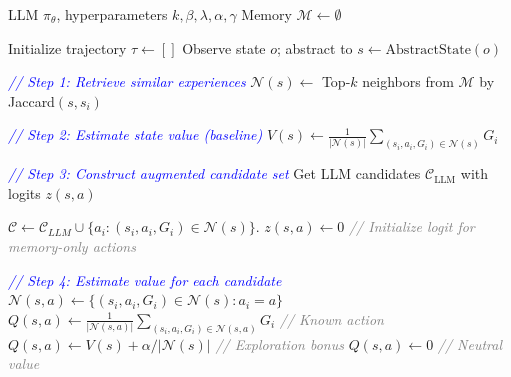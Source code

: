 


\begin{algorithm}[h]
    \caption{JitRL: Test-Time Policy Optimization}
    \label{alg:jitrl}
 \begin{algorithmic}
     LLM $\pi_\theta$, hyperparameters $k, \beta, \lambda, \alpha, \gamma$
     Memory $\mathcal{M} \leftarrow \emptyset$

        \STATE Initialize trajectory $\tau \leftarrow []$
            \STATE Observe state $o$; abstract to $s \leftarrow \text{AbstractState}(o)$

            \STATE \textcolor{blue}{\textit{// Step 1: Retrieve similar experiences}}
            \STATE $\mathcal{N}(s) \leftarrow$ Top-$k$ neighbors from $\mathcal{M}$ by Jaccard$(s, s_i)$

            \STATE \textcolor{blue}{\textit{// Step 2: Estimate state value (baseline)}}
            \STATE $V(s) \leftarrow \frac{1}{|\mathcal{N}(s)|}\sum_{(s_i, a_i, G_i) \in \mathcal{N}(s)} G_i$

            \STATE \textcolor{blue}{\textit{// Step 3: Construct augmented candidate set}}
            \STATE Get LLM candidates $\mathcal{C}_{\text{LLM}}$ with logits $z(s,a)$

            \STATE $\mathcal{C} \leftarrow \mathcal{C}_{LLM} \cup \{ a_i : (s_i, a_i, G_i) \in \mathcal{N}(s) \}$.
                \STATE $z(s,a) \leftarrow 0$ \hfill \textcolor{gray}{\textit{// Initialize logit for memory-only actions}}
            \ENDFOR

            \STATE \textcolor{blue}{\textit{// Step 4: Estimate value for each candidate}}
                \STATE $\mathcal{N}(s, a) \leftarrow \{(s_i, a_i, G_i) \in \mathcal{N}(s) : a_i = a\}$
                    \STATE $Q(s,a) \leftarrow \frac{1}{|\mathcal{N}(s,a)|}\sum_{(s_i, a_i, G_i) \in \mathcal{N}(s,a)} G_i$ \hfill \textcolor{gray}{\textit{// Known action}}
                \ELSE
                        \STATE $Q(s,a) \leftarrow V(s) + \alpha / |\mathcal{N}(s)|$ \hfill \textcolor{gray}{\textit{// Exploration bonus}}
                    \ELSE
                        \STATE $Q(s,a) \leftarrow 0$ \hfill \textcolor{gray}{\textit{// Neutral value}}
                    \ENDIF
                \ENDIF
            \ENDFOR


\end{algorithmic}
\end{algorithm}
